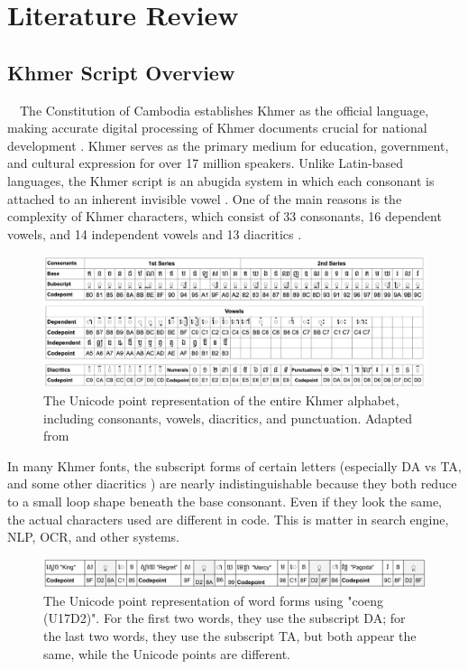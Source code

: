 \chapter{Literature Review}
\label{ch:literature}

\section{Khmer Script Overview}
\label{sec:Khmer-overview}
​ ​ ​ ​ The Constitution of Cambodia establishes Khmer as the 
official language, making accurate digital processing of
Khmer documents crucial for national 
development \citet{Accuracy_Improvement}.
Khmer serves as the primary medium for education, government, 
and cultural expression for over 17 million 
speakers. Unlike Latin-based languages, the Khmer script is an abugida system 
in which each consonant is attached to an inherent 
invisible vowel \citep{buoy2023khmerocr}. One of the main reasons is
the complexity of Khmer characters, which consist of 33 consonants,
16 dependent vowels, and 14 independent vowels and 13 
diacritics \citet{nom2024khmerst}. 


\begin{figure}[H]
  \centering
  \includegraphics[width=\textwidth]{figures/khmer_alphabet.png}
  \caption{The Unicode point representation of the entire 
  Khmer alphabet, including consonants, vowels, diacritics, 
  and punctuation. Adapted from}
  \label{fig:khmer_alphabets}
\end{figure}

In many Khmer fonts, the subscript forms of certain 
letters (especially DA vs TA, and some other diacritics ) are nearly indistinguishable 
because they both reduce to a small loop shape beneath the base consonant.
Even if they look the same, the actual 
characters used are different in code. This is matter in
search engine, NLP, OCR, and other systems. \citet{Ansary}

\begin{figure}[H]
  \centering
  \includegraphics[width=\textwidth]{figures/khmer_word_codepoint.png}
  \caption{The Unicode point representation of word forms using 
  "coeng (U17D2)". For the first two words, they use the 
  subscript DA; for the last two words, they use the 
  subscript TA, but both appear the same, while the Unicode 
  points are different.}
  \label{fig:khmer_codepoints}
\end{figure}


